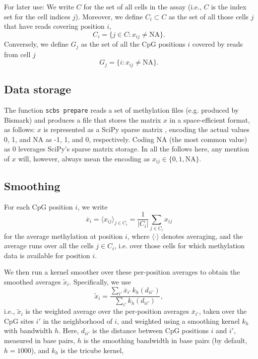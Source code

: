 \documentclass[twocolumn,10pt]{article}
\newcommand{\todo}[1]{[\textcolor{orange}{#1}]}
\begin{document}
For later use: We write $C$ for the set of all cells in the assay (i.e., $C$ is the index set for the cell indices $j$).
Moreover,
we define $C_i\subset C$ as the set of all those cells $j$ that have reads covering position $i$,
$$ C_i=\{j\in C: x_{ij}\neq\text{NA}\}.$$
Conversely, we define $G_j$ as the set of all the CpG positions $i$ covered by reads from cell $j$ 
$$ G_j=\{i: x_{ij}\neq\text{NA}\}.$$

\subsection{Data storage}

The function \texttt{scbs prepare} reads a set of methylation files (e.g.
produced by Bismark) and produces a file that stores the matrix $x$ in a space-efficient format, as follows: $x$ is represented as a SciPy sparse matrix \citep{SciPy}, encoding the actual values 0, 1, and NA as -1, 1, and 0, respectively.
Coding NA (the most common value) as 0 leverages SciPy's sparse matrix storage.
In all the follows here, any mention of $x$ will, however, always mean the encoding as $x_{ij}\in\{0,1,\text{NA}\}$.

\subsection{Smoothing}

For each CpG position $i$, we write 
$$\overline{x}_i=\langle x_{ij} \rangle_{j\in C_i} = \frac{1}{|C_i|}\sum_{j\in C_i} x_{ij}$$ 
for the average methylation at position $i$, where $\langle\cdot\rangle$ denotes averaging, and the average runs over all the cells $j\in C_i$, i.e.
over those cells for which methylation data is available for position $i$.


We then run a kernel smoother over these per-position averages to obtain the smoothed averages $\tilde x_i$.
Specifically, we use
\[ \tilde x_i = \frac{\sum_{i'} \overline x_{i'}\, k_h(d_{ii'})}{\sum_{i'} k_h(d_{ii'})},\]
i.e., $\tilde x_i$ is the weighted average over the per-position averages $\overline{x}_{i'}$, taken over the CpG sites $i'$ in the neighborhood of $i$, and weighted using a smoothing kernel $k_h$ with bandwidth $h$.
Here, $d_{ii'}$ is the distance between CpG positions $i$ and $i'$, measured in base pairs, $h$ is the smoothing bandwidth in base pairs (by default, $h=1000$), and $k_h$ is the tricube kernel,
\end{document}
